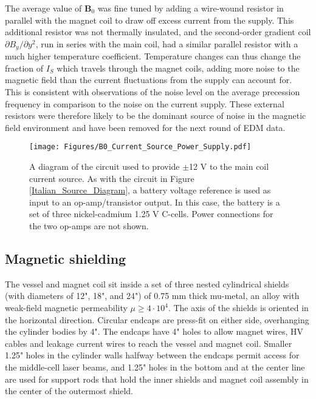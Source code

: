 \documentclass [10pt, twoside] {uwthesis}[2012/04/02]
\begin{document}
The average value of $\mathbf{B}_0$ was fine tuned by adding a wire-wound resistor in parallel with the magnet coil to draw off excess current from the supply. This additional resistor was not thermally insulated, and the second-order gradient coil $\partial B_y/\partial y^2$, run in series with the main coil, had a similar parallel resistor with a much higher temperature coefficient. Temperature changes can thus change the fraction of $I_S$ which travels through the magnet coils, adding more noise to the magnetic field than the current fluctuations from the supply can account for. This is consistent with observations of the noise level on the average precession frequency in comparison to the noise on the current supply. These external resistors were therefore likely to be the dominant source of noise in the magnetic field environment and have been removed for the next round of EDM data.

\begin{figure}
\begin{center}
\texttt{[image: Figures/B0\_Current\_Source\_Power\_Supply.pdf]}
\end{center}
\caption[$\mathbf{B}_0$ power supply diagram]{\narrower A diagram of the circuit used to provide $\pm$12 V to the main coil current source. As with the circuit in Figure \ref{Italian_Source_Diagram}, a battery voltage reference is used as input to an op-amp/transistor output. In this case, the battery is a set of three nickel-cadmium 1.25 V C-cells. Power connections for the two op-amps are not shown.}
\label{Italian_Source_Power_Supply}
\end{figure}

\subsection{Magnetic shielding}
The vessel and magnet coil sit inside a set of three nested cylindrical shields (with diameters of 12", 18", and 24") of 0.75 mm thick mu-metal, an alloy with weak-field magnetic permeability $\mu \geq 4\cdot10^4$. The axis of the shields is oriented in the horizontal direction. Circular endcaps are press-fit on either side, overhanging the cylinder bodies by 4". The endcaps have 4" holes to allow magnet wires, HV cables and leakage current wires to reach the vessel and magnet coil. Smaller 1.25" holes in the cylinder walls halfway between the endcaps permit access for the middle-cell laser beams, and 1.25" holes in the bottom and at the center line are used for support rods that hold the inner shields and magnet coil assembly in the center of the outermost shield. 
\end{document}
